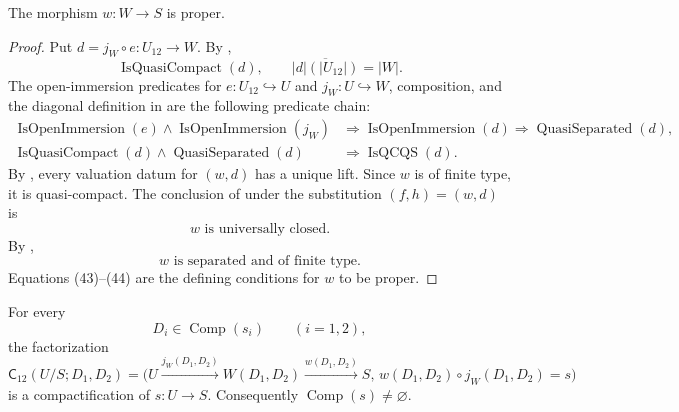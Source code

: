 \begin{lemma}
  \label{lemma:nagata-two-open-candidate-proper}

  The morphism $w\colon W\to S$ is proper.
\end{lemma}

\begin{proof}
  Put $d=j_W\circ e\colon U_{12}\to W$.  By
  ,
  \[
    \operatorname{IsQuasiCompact}(d),\qquad
    \overline{|d|(|U_{12}|)}=|W|.
  \]
  The open-immersion predicates for $e\colon U_{12}\hookrightarrow U$ and
  $j_W\colon U\hookrightarrow W$, composition, and the diagonal definition
  in  are the following
  predicate chain:
  \[
  \begin{aligned}
    \operatorname{IsOpenImmersion}(e)\wedge
      \operatorname{IsOpenImmersion}(j_W)
      &\Longrightarrow\operatorname{IsOpenImmersion}(d)
       \Longrightarrow\operatorname{QuasiSeparated}(d),\\
    \operatorname{IsQuasiCompact}(d)\wedge
      \operatorname{QuasiSeparated}(d)
      &\Longrightarrow\operatorname{IsQCQS}(d).
  \end{aligned}
  \]
  By , every valuation datum for
  $(w,d)$ has a unique lift.  Since $w$ is of finite type, it is
  quasi-compact.  The conclusion of
   under the substitution
  $(f,h)=(w,d)$ is
  \[
    w\text{ is universally closed}.                               \tag{43}
  \]
  By ,
  \[
    w\text{ is separated and of finite type}.                     \tag{44}
  \]
  Equations (43)--(44) are the defining conditions for $w$ to be proper.
\end{proof}

\begin{theorem}
  \label{thm:nagata-two-open}

  For every
  \[
    D_i\in\operatorname{Comp}(s_i)\qquad(i=1,2),
  \]
  the factorization
  \[
    \mathsf C_{12}(U/S;D_1,D_2)
      =
      \bigl(
        U\xrightarrow{j_W(D_1,D_2)}W(D_1,D_2)
          \xrightarrow{w(D_1,D_2)}S,\,
        w(D_1,D_2)\circ j_W(D_1,D_2)=s
      \bigr)
  \]
  is a compactification of $s\colon U\to S$.  Consequently
  $\operatorname{Comp}(s)\neq\varnothing$.
\end{theorem}

